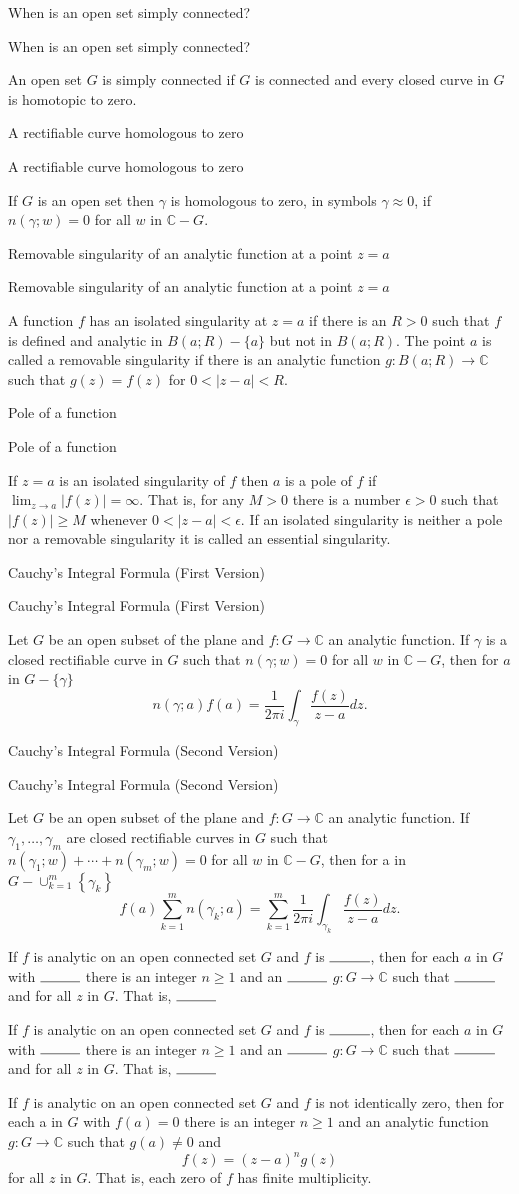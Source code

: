 \documentclass[17pt]{extarticle}
\newcommand{\C}{\mathbb{C}}
\newcommand{\boxset}[2]{\begin{mdframed}[style=darkQuesion]
#1
\end{mdframed}
\newpage
\begin{mdframed}[style=darkQuesion]
  #1
    \end{mdframed}
\begin{mdframed}[style=darkAnswer]
  #2
    \end{mdframed}
    \newpage
}
\begin{document}
\boxset{When is an open set simply connected? }
{ An open set $G$ is simply connected if $G$ is connected and every closed curve in $G$ is homotopic to zero.}
\boxset{A rectifiable curve homologous to zero }
{ If $G$ is an open set then $\gamma$ is homologous to zero, in symbols $\gamma \approx 0$, if $n(\gamma ; w)=0$ for all $w$ in $\C-G$.}
\boxset{Removable singularity of an analytic function at a point $z=a$ }
{ A function $f$ has an isolated singularity at $z=a$ if there is an $R>0$ such that $f$ is defined and analytic in $B(a ; R)-\{a\}$ but not in $B(a ; R)$. The point $a$ is called a removable singularity if there is an analytic function $g: B(a ; R) \rightarrow \C$ such that $g(z)=f(z)$ for $0<|z-a|<R$.}
\boxset{Pole of a function }
{If $z=a$ is an isolated singularity of $f$ then $a$ is a pole of $f$ if $\lim _{z \rightarrow a}|f(z)|=\infty$. That is, for any $M>0$ there is a number $\epsilon>0$ such that $|f(z)| \geq M$ whenever $0<|z-a|<\epsilon$. If an isolated singularity is neither a pole nor a removable singularity it is called an essential singularity.}
\boxset{Cauchy's Integral Formula (First Version) }
{Let $G$ be an open subset of the plane and $f: G \rightarrow \mathbb{C}$ an analytic function. If $\gamma$ is a closed rectifiable curve in $G$ such that $n(\gamma ; w)=0$ for all $w$ in $\mathbb{C}-G$, then for $a$ in $G-\{\gamma\}$ \[n(\gamma ; a) f(a)=\frac{1}{2 \pi i} \int_{\gamma} \frac{f(z)}{z-a} d z .\]}
\boxset{Cauchy's Integral Formula (Second Version) }
{Let $G$ be an open subset of the plane and $f: G \rightarrow \mathbb{C}$ an analytic function. If $\gamma_{1}, \ldots, \gamma_{m}$ are closed rectifiable curves in $G$ such that $n\left(\gamma_{1} ; w\right)+\cdots+n\left(\gamma_{m} ; w\right)=0$ for all $w$ in $\mathbb{C}-G$, then for a in $G-\cup_{k=1}^{m}\left\{\gamma_{k}\right\}$ \[f(a) \sum_{k=1}^{m} n\left(\gamma_{k} ; a\right)=\sum_{k=1}^{m} \frac{1}{2 \pi i} \int_{\gamma_{k}} \frac{f(z)}{z-a} d z .\]}
\boxset{ If $f$ is analytic on an open connected set $G$ and $f$ is $\rule{1cm}{0.15mm}$, then for each $a$ in $G$ with $\rule{1cm}{0.15mm}$ there is an integer $n \geq 1$ and an $\rule{1cm}{0.15mm}$ $g: G \rightarrow \mathbb{C}$ such that $\rule{1cm}{0.15mm}$ and for all $z$ in $G$. That is, $\rule{1cm}{0.15mm}$  }
{ If $f$ is analytic on an open connected set $G$ and $f$ is not identically zero, then for each a in $G$ with $f(a)=0$ there is an integer $n \geq 1$ and an analytic function $g: G \rightarrow \mathbb{C}$ such that $g(a) \neq 0$ and \[f(z)=(z-a)^{n} g(z)\] for all $z$ in $G$. That is, each zero of $f$ has finite multiplicity.}
\end{document}

